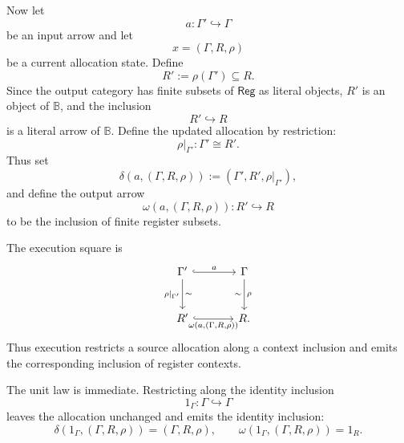 \begin{example}
    Now let
    \[
        a:\Gamma'\hookrightarrow \Gamma
    \]
    be an input arrow and let
    \[
        x=(\Gamma,R,\rho)
    \]
    be a current allocation state. Define
    \[
        R':=\rho(\Gamma')\subseteq R.
    \]
    Since the output category has finite subsets of \(\mathsf{Reg}\) as literal objects, \(R'\) is an object of \(\mathbb B\), and the inclusion
    \[
        R'\hookrightarrow R
    \]
    is a literal arrow of \(\mathbb B\). Define the updated allocation by restriction:
    \[
        \rho|_{\Gamma'}:\Gamma'\cong R'.
    \]
    Thus set
    \[
        \delta(a,(\Gamma,R,\rho))
        :=
        (\Gamma',R',\rho|_{\Gamma'}),
    \]
    and define the output arrow
    \[
        \omega(a,(\Gamma,R,\rho)):R'\hookrightarrow R
    \]
    to be the inclusion of finite register subsets.
    
    The execution square is
    \[
        \begin{tikzcd}[column sep=large, row sep=large]
                \Gamma'
                    \arrow[r, hook, "{a}"]
                    \arrow[d, "{\rho|_{\Gamma'}}"', "\sim"]
            &
                \Gamma
                    \arrow[d, "{\rho}", "\sim"']
            \\
                R'
                    \arrow[r, hook, "{\omega(a,(\Gamma,R,\rho))}"']
            &
                R.
        \end{tikzcd}
    \]
    Thus execution restricts a source allocation along a context inclusion and emits the corresponding inclusion of register contexts.
    
    The unit law is immediate. Restricting along the identity inclusion
    \[
        1_\Gamma:\Gamma\hookrightarrow \Gamma
    \]
    leaves the allocation unchanged and emits the identity inclusion:
    \[
        \delta(1_\Gamma,(\Gamma,R,\rho))=(\Gamma,R,\rho),
        \qquad
        \omega(1_\Gamma,(\Gamma,R,\rho))=1_R.
    \]
    

\end{example}
